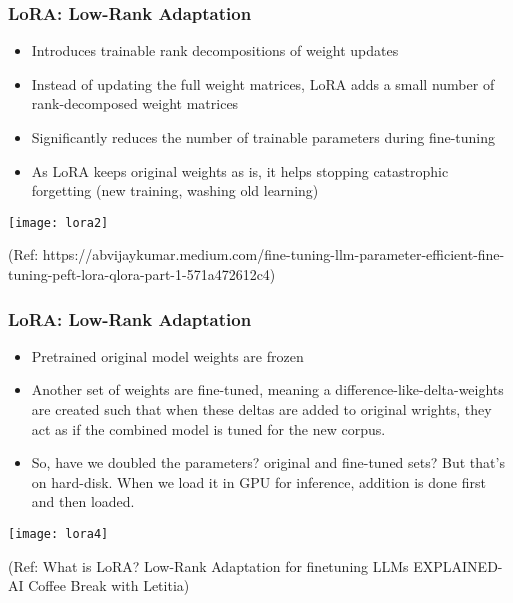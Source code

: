 \begin{frame}[fragile]\frametitle{LoRA: Low-Rank Adaptation}
\begin{itemize}
    \item Introduces trainable rank decompositions of weight updates
    \item Instead of updating the full weight matrices, LoRA adds a small number of rank-decomposed weight matrices
    \item Significantly reduces the number of trainable parameters during fine-tuning
	\item As LoRA keeps original weights as is, it helps stopping catastrophic forgetting (new training, washing old learning)
\end{itemize}

		\begin{center}
		\texttt{[image: lora2]}
		
		{\tiny (Ref: https://abvijaykumar.medium.com/fine-tuning-llm-parameter-efficient-fine-tuning-peft-lora-qlora-part-1-571a472612c4)}
		\end{center}

\end{frame}


\begin{frame}[fragile]\frametitle{LoRA: Low-Rank Adaptation}
    \begin{itemize}
        \item Pretrained original model weights are frozen
		\item Another set of weights are fine-tuned, meaning a difference-like-delta-weights are created such that when these deltas are added to original wrights, they act as if the combined model is tuned for the new corpus.
		\item So, have we doubled the parameters? original and fine-tuned sets? But that's on hard-disk. When we load it in GPU for inference, addition is done first and then loaded.
    \end{itemize}

		\begin{center}
		\texttt{[image: lora4]}
		
		{\tiny (Ref: What is LoRA? Low-Rank Adaptation for finetuning LLMs EXPLAINED-AI Coffee Break with Letitia)}
		\end{center}

\end{frame}

